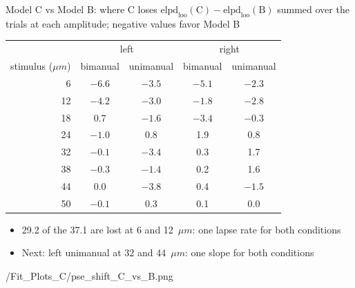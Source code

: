 \begin{frame}{Model C vs Model B: where C loses}
  $\text{elpd}_\text{loo}(\text{C}) - \text{elpd}_\text{loo}(\text{B})$ summed over the trials at
  each amplitude; negative values favor Model B
  \vspace{0.2em}

  \centering\footnotesize
  \renewcommand{\arraystretch}{0.85}
  \begin{tabular}{rcccc}
    \toprule
     & \multicolumn{2}{c}{left} & \multicolumn{2}{c}{right} \\
    stimulus ($\mu m$) & bimanual & unimanual & bimanual & unimanual \\
    \midrule
    6  & $-6.6$ & $-3.5$ & $-5.1$ & $-2.3$ \\
    12 & $-4.2$ & $-3.0$ & $-1.8$ & $-2.8$ \\
    18 & 0.7    & $-1.6$ & $-3.4$ & $-0.3$ \\
    24 & $-1.0$ & 0.8    & 1.9    & 0.8 \\
    32 & $-0.1$ & $-3.4$ & 0.3    & 1.7 \\
    38 & $-0.3$ & $-1.4$ & 0.2    & 1.6 \\
    44 & 0.0    & $-3.8$ & 0.4    & $-1.5$ \\
    50 & $-0.1$ & 0.3    & 0.1    & 0.0 \\
    \bottomrule
  \end{tabular}

  \vspace{0.2em}
  \raggedright
  {\small
  \begin{itemize}
    \item 29.2 of the 37.1 are lost at 6 and 12~$\mu m$: one lapse rate for both conditions
    \item Next: left unimanual at 32 and 44~$\mu m$: one slope for both conditions
  \end{itemize}}
\end{frame}

  {\plotsC/Fit_Plots_C/pse_shift_C_vs_B.png}

